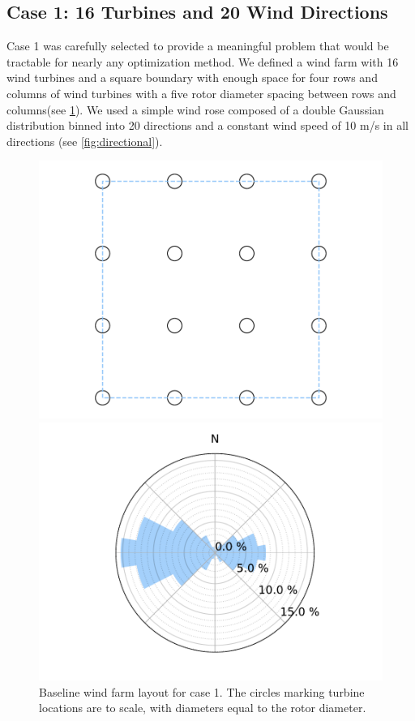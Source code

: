 \documentclass{jpconf}
\begin{document}
\subsection{Case 1: 16 Turbines and 20 Wind Directions}
Case 1 was carefully selected to provide a meaningful problem that would be tractable for nearly any optimization method. We defined a wind farm with 16 wind turbines and a square boundary with enough space for four rows and columns of wind turbines with a five rotor diameter spacing between rows and columns(see \cref{fig:layout1}). We used a simple wind rose composed of a double Gaussian distribution binned into 20 directions and a constant wind speed of 10 m/s in all directions (see \cref{fig:directional}).
\begin{figure}[h!]
\centering
\begin{minipage}[t]{18pc}
\centering
\includegraphics[width=1.\textwidth, trim={1.5cm, 0cm, 1.5cm, 0cm}, clip]{final_images/layouts/16_turb_start.pdf}
\caption{Baseline wind farm layout for case 1. The circles marking turbine locations are to scale, with diameters equal to the rotor diameter.}
\label{fig:layout1}
\end{minipage}\hspace{1pc}%
\begin{minipage}[t]{18pc}
\centering
\includegraphics[width=\textwidth, trim={2.0cm 0cm 2.0cm 0cm}, clip]{final_images/windroses/freqwindrose_20_dir.pdf}

\end{minipage}
\end{figure}
\end{document}
